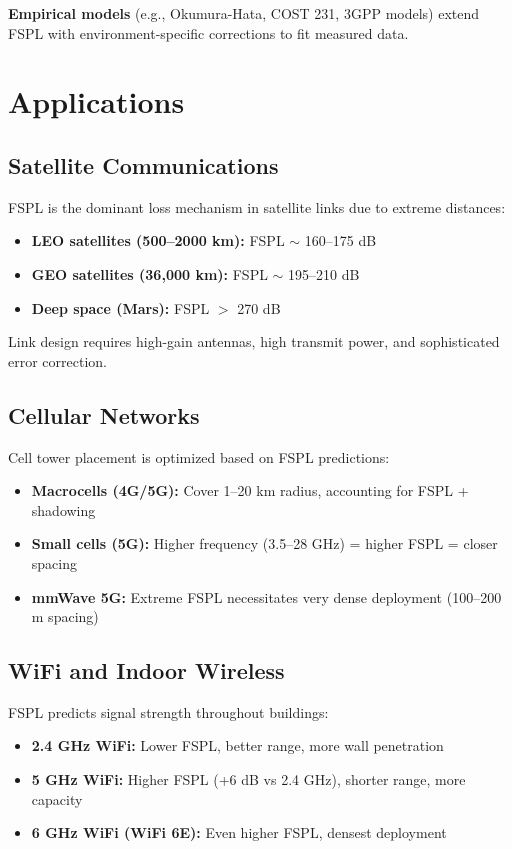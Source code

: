 \textbf{Empirical models} (e.g., Okumura-Hata, COST 231, 3GPP models) extend FSPL with environment-specific corrections to fit measured data.

\section{Applications}
\label{sec:applications}

\subsection{Satellite Communications}

FSPL is the dominant loss mechanism in satellite links due to extreme distances:
\begin{itemize}
\item \textbf{LEO satellites (500--2000 km):} FSPL $\sim$ 160--175 dB
\item \textbf{GEO satellites (36,000 km):} FSPL $\sim$ 195--210 dB
\item \textbf{Deep space (Mars):} FSPL $>$ 270 dB
\end{itemize}

Link design requires high-gain antennas, high transmit power, and sophisticated error correction.

\subsection{Cellular Networks}

Cell tower placement is optimized based on FSPL predictions:
\begin{itemize}
\item \textbf{Macrocells (4G/5G):} Cover 1--20 km radius, accounting for FSPL + shadowing
\item \textbf{Small cells (5G):} Higher frequency (3.5--28 GHz) = higher FSPL = closer spacing
\item \textbf{mmWave 5G:} Extreme FSPL necessitates very dense deployment (100--200 m spacing)
\end{itemize}

\subsection{WiFi and Indoor Wireless}

FSPL predicts signal strength throughout buildings:
\begin{itemize}
\item \textbf{2.4 GHz WiFi:} Lower FSPL, better range, more wall penetration
\item \textbf{5 GHz WiFi:} Higher FSPL (+6 dB vs 2.4 GHz), shorter range, more capacity
\item \textbf{6 GHz WiFi (WiFi 6E):} Even higher FSPL, densest deployment
\end{itemize}

